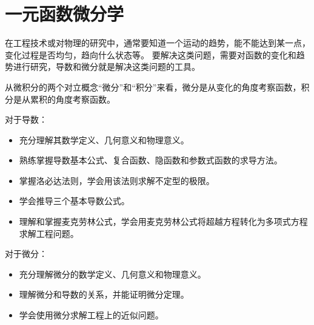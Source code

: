\chapter{一元函数微分学}

在工程技术或对物理的研究中，通常要知道一个运动的趋势，能不能达到某一点，变化过程是否均匀，趋向什么状态等。
要解决这类问题，需要对函数的变化和趋势进行研究，导数和微分就是解决这类问题的工具。

从微积分的两个对立概念“微分”和“积分”来看，微分是从变化的角度考察函数，积分是从累积的角度考察函数。

对于导数：
\begin{itemize}
    \item 充分理解其数学定义、几何意义和物理意义。
    \item 熟练掌握导数基本公式、复合函数、隐函数和参数式函数的求导方法。
    \item 掌握洛必达法则，学会用该法则求解不定型的极限。
    \item 学会推导三个基本导数公式。
    \item 理解和掌握麦克劳林公式，学会用麦克劳林公式将超越方程转化为多项式方程求解工程问题。
\end{itemize}

对于微分：
\begin{itemize}
    \item 充分理解微分的数学定义、几何意义和物理意义。
    \item 理解微分和导数的关系，并能证明微分定理。
    \item 学会使用微分求解工程上的近似问题。
\end{itemize}

\newpage


\newpage


\newpage


\newpage


\newpage


\newpage


\newpage


\newpage


\newpage





